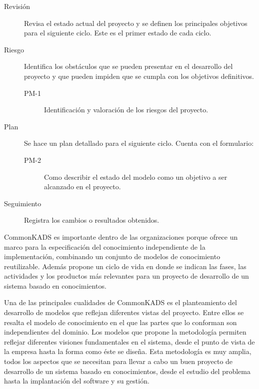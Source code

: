 \begin{description}
\item[Revisión] Revisa el estado actual del proyecto y se definen los principales objetivos para el siguiente ciclo. Este es el primer estado de cada ciclo.
\item[Riesgo] Identifica los obstáculos que se pueden presentar en el desarrollo del proyecto y que pueden impiden que se cumpla con los objetivos definitivos.
  \begin{description}
  \item[PM-1] Identificación y valoración de los riesgos del proyecto.
  \end{description}
\item[Plan] Se hace un plan detallado para el siguiente ciclo. Cuenta con el formulario:
  \begin{description}
  \item[PM-2] Como describir el estado del modelo como un objetivo a ser alcanzado en el proyecto.
  \end{description}
\item[Seguimiento] Registra los cambios o resultados obtenidos.
\end{description}

CommonKADS es importante dentro de las organizaciones porque ofrece un marco para la especificación del conocimiento independiente de la implementación, combinando un conjunto de modelos de conocimiento reutilizable. Además propone un ciclo de vida en donde se indican las fases, las actividades y los productos más relevantes para un proyecto de desarrollo de un sistema basado en conocimientos.

Una de las principales cualidades de CommonKADS es el planteamiento del desarrollo de modelos que reflejan diferentes vistas del proyecto. Entre ellos se resalta el modelo de conocimiento en el que las partes que lo conforman son independientes del dominio.
Los modelos que propone la metodología permiten reflejar diferentes visiones fundamentales en el sistema, desde el punto de vista de la empresa hasta la forma como éste se diseña. Esta metodología es muy amplia, todos los aspectos que se necesitan para llevar a cabo un buen proyecto de desarrollo de un sistema basado en conocimientos, desde el estudio del problema hasta la implantación del software y su gestión.






%

